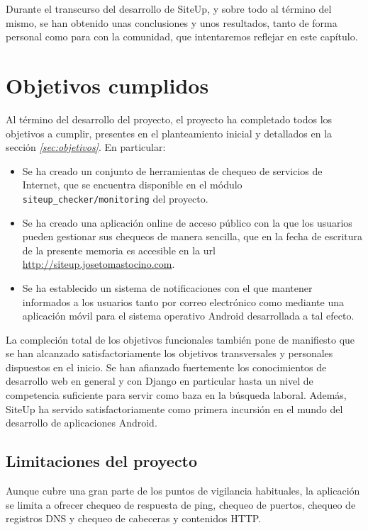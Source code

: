 Durante el transcurso del desarrollo de SiteUp, y sobre todo al término del
mismo, se han obtenido unas conclusiones y unos resultados, tanto de forma
personal como para con la comunidad, que intentaremos reflejar en este capítulo.


\section{Objetivos cumplidos}
Al término del desarrollo del proyecto, el proyecto ha completado todos los
objetivos a cumplir, presentes en el planteamiento inicial y detallados en la
sección \textit{\ref{sec:objetivos}}. En particular:

\begin{itemize}
\item Se ha creado un conjunto de herramientas de chequeo de servicios de
  Internet, que se encuentra disponible en el módulo
  \texttt{siteup\_checker/monitoring} del proyecto.
\item Se ha creado una aplicación online de acceso público con la que los
  usuarios pueden gestionar sus chequeos de manera sencilla, que en la fecha de
  escritura de la presente memoria es accesible en la url
  \url{http://siteup.josetomastocino.com}.
\item Se ha establecido un sistema de notificaciones con el que mantener
  informados a los usuarios tanto por correo electrónico como mediante una
  aplicación móvil para el sistema operativo Android desarrollada a tal efecto.
\end{itemize}

La compleción total de los objetivos funcionales también pone de manifiesto que
se han alcanzado satisfactoriamente los objetivos transversales y personales
dispuestos en el inicio. Se han afianzado fuertemente los conocimientos de
desarrollo web en general y con Django en particular hasta un nivel de
competencia suficiente para servir como baza en la búsqueda laboral. Además,
SiteUp ha servido satisfactoriamente como primera incursión en el mundo del
desarrollo de aplicaciones Android.

\subsection{Limitaciones del proyecto}
Aunque cubre una gran parte de los puntos de vigilancia habituales, la
aplicación se limita a ofrecer chequeo de respuesta de ping, chequeo de puertos,
chequeo de registros DNS y chequeo de cabeceras y contenidos HTTP.


